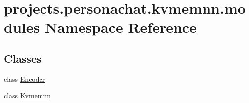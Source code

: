 \hypertarget{namespaceprojects_1_1personachat_1_1kvmemnn_1_1modules}{}\section{projects.\+personachat.\+kvmemnn.\+modules Namespace Reference}
\label{namespaceprojects_1_1personachat_1_1kvmemnn_1_1modules}
\subsection*{Classes}
\begin{DoxyCompactItemize}
\item 
class \hyperlink{classprojects_1_1personachat_1_1kvmemnn_1_1modules_1_1Encoder}{Encoder}
\item 
class \hyperlink{classprojects_1_1personachat_1_1kvmemnn_1_1modules_1_1Kvmemnn}{Kvmemnn}
\end{DoxyCompactItemize}
